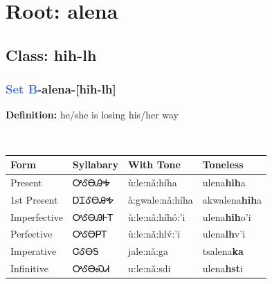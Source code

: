 \needspace{4in}
\section*{Root: alena}
\nopagebreak
{}
\needspace{3in}
\subsection*{Class: hih-lh}
\nopagebreak
\needspace{2in}
\subsubsection*{\textcolor{RoyalBlue}{Set B}{-}\textbf{alena}{-}[hih-lh]}
\nopagebreak
\textbf{Definition: } he/she is losing his/her way
\\[0.5em]
\begin{tabularx}{\textwidth}{l X X X}%
\toprule%
\textbf{Form}&\textbf{Syllabary}&\textbf{With Tone}&\textbf{Toneless}\\%
\midrule%
Present&ᎤᎴᎾᎯᎭ&ù:le:nǎ:híha&ulena\textbf{hih}a\\%
1st Present&ᎠᏆᎴᎾᎯᎭ&à:gwale:nǎ:híha&akwalena\textbf{hih}a\\%
Imperfective&ᎤᎴᎾᎯᎰᎢ&ù:le:nǎ:híhó:’i&ulena\textbf{hih}o'i\\%
Perfective&ᎤᎴᎾᏢᎢ&ù:le:nǎ:hlv́:’i&ulena\textbf{lh}v'i\\%
Imperative&ᏣᎴᎾᎦ&jale:nǎ:ga&tsalena\textbf{ka}\\%
Infinitive&ᎤᎴᎾᏍᏗ&u:le:nǎ:sdi&ulena\textbf{hst}i\\%
\bottomrule%
\end{tabularx}
\\[1em]
